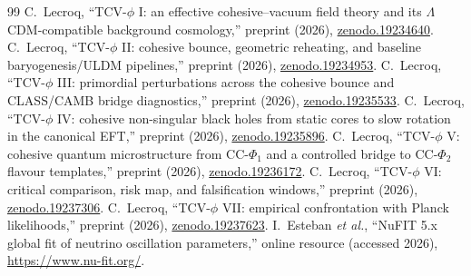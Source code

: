 \documentclass[aps,prd,onecolumn,nofootinbib,superscriptaddress]{revtex4-2}
\begin{document}
\begin{thebibliography}{99}
 C.~Lecroq, ``TCV-$\phi$ I: an effective cohesive--vacuum field theory and its $\Lambda$CDM-compatible background cosmology,'' preprint (2026), \href{https://doi.org/10.5281/zenodo.19234640}{zenodo.19234640}.
 C.~Lecroq, ``TCV-$\phi$ II: cohesive bounce, geometric reheating, and baseline baryogenesis/ULDM pipelines,'' preprint (2026), \href{https://doi.org/10.5281/zenodo.19234953}{zenodo.19234953}.
 C.~Lecroq, ``TCV-$\phi$ III: primordial perturbations across the cohesive bounce and CLASS/CAMB bridge diagnostics,'' preprint (2026), \href{https://doi.org/10.5281/zenodo.19235533}{zenodo.19235533}.
 C.~Lecroq, ``TCV-$\phi$ IV: cohesive non-singular black holes from static cores to slow rotation in the canonical EFT,'' preprint (2026), \href{https://doi.org/10.5281/zenodo.19235896}{zenodo.19235896}.
 C.~Lecroq, ``TCV-$\phi$ V: cohesive quantum microstructure from CC-$\Phi_1$ and a controlled bridge to CC-$\Phi_2$ flavour templates,'' preprint (2026), \href{https://doi.org/10.5281/zenodo.19236172}{zenodo.19236172}.
 C.~Lecroq, ``TCV-$\phi$ VI: critical comparison, risk map, and falsification windows,'' preprint (2026), \href{https://doi.org/10.5281/zenodo.19237306}{zenodo.19237306}.
 C.~Lecroq, ``TCV-$\phi$ VII: empirical confrontation with Planck likelihoods,'' preprint (2026), \href{https://doi.org/10.5281/zenodo.19237623}{zenodo.19237623}.
 I.~Esteban \textit{et al.}, ``NuFIT 5.x global fit of neutrino oscillation parameters,'' online resource (accessed 2026), \url{https://www.nu-fit.org/}.
\end{thebibliography}
\end{document}
